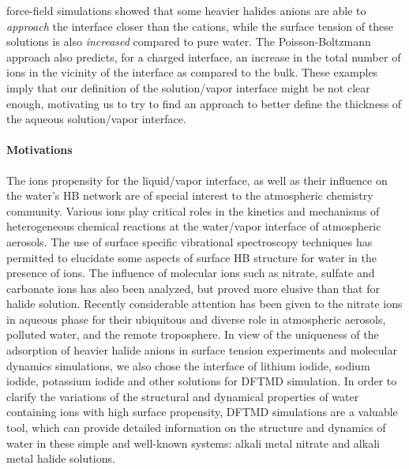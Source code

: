 force-field simulations\cite{Perera1991,Dang1993,Knipping00,Jungwirth2001,Jungwirth2002,PJ06,Horinek07,Brown08,CST11} showed that 
some heavier halides anions are able to \emph{approach} the interface closer than the cations, 
while the surface tension of these solutions is also \emph{increased} compared to pure water. 
The Poisson-Boltzmann approach also predicts, for a charged interface, an increase in the total number of ions in the vicinity of the interface as compared to the bulk\cite{Manciu2003}.
These examples imply that our definition of the solution/vapor interface might be not clear enough, 
motivating us to try to find an approach to better define the thickness of the aqueous solution/vapor interface.

\paragraph{Motivations}
%
The ions propensity for the liquid/vapor interface, as well as their influence on  
the water's HB network are of special interest to the atmospheric chemistry community.%
Various ions play critical roles in the kinetics and mechanisms of heterogeneous chemical reactions 
at the water/vapor interface of atmospheric aerosols. 
The use of surface specific vibrational spectroscopy techniques has 
permitted to elucidate some aspects of surface HB structure for water in 
the presence of ions\cite{AJ12,AGL05}. The influence of molecular ions such as nitrate­, sulfate­ and 
carbonate ions­ has also been analyzed, but proved more elusive than that for halide solution\cite{SG05,PS03}.
Recently considerable attention has been given to the nitrate ions in aqueous phase 
for their ubiquitous and diverse role in atmospheric aerosols, polluted water, 
and the remote troposphere\cite{Pitts2000,XuM2009,Jubb2012,Cochran2017}.
In view of the uniqueness of the adsorption of heavier halide anions in surface tension experiments and molecular dynamics simulations, 
we also chose the interface of lithium iodide, sodium iodide, potassium iodide and other solutions for DFTMD simulation.
In order to clarify the variations of the structural and dynamical properties 
of water containing ions with high surface propensity, DFTMD simulations are a valuable tool, 
which can provide detailed information on the structure and dynamics  
of water in these simple and well-known systems: alkali metal nitrate and alkali metal halide solutions\cite{KM98}.


